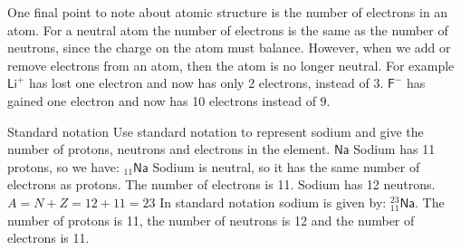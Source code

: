 \label{m38745*eip-950}\vspace{.5cm} 
      \noindent 
One final point to note about atomic structure is the number of electrons in an atom. For a neutral atom the number of electrons is the same as the number of neutrons, since the charge on the atom must balance. However, when we add or remove electrons from an atom, then the atom is no longer neutral. For example $\mathsf{Li}^{+}$ has lost one electron and now has only 2 electrons, instead of 3. $\mathsf{F}^{-}$ has gained one electron and now has 10 electrons instead of 9.   
\begin{wex}
{%
Standard notation
}
{%
Use standard notation to represent sodium and give the number of protons, neutrons and electrons in the element.
}
{%
 $\mathsf{Na}$
 Sodium has 11 protons, so we have: ${}_{11}\mathsf{Na}$
 Sodium is neutral, so it has the same number of electrons as protons. The number of electrons is 11.
 Sodium has 12 neutrons.
 $A=N+Z=12+11=23$
 In standard notation sodium is given by: $_{11}^{23}\mathsf{Na}$. The number of protons is 11, the number of neutrons is 12 and the number of electrons is 11.
}    
\end{wex}
    

